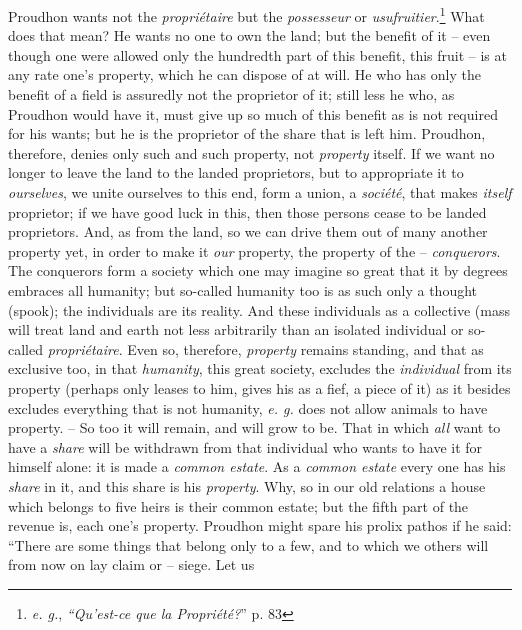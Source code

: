\documentclass[12pt,a4paper]{book}
\begin{document}
Proudhon wants not the \textit{propri\'etaire} but the \textit{possesseur} or 
\textit{usufruitier}.\footnote{\textit{e. g.}, \textit{``Qu'est-ce que la 
Propri\'et\'e?}'' p. 83} What does that mean? He wants no one to own the 
land; but the benefit of it -- even though one were allowed only the hundredth 
part of this benefit, this fruit -- is at any rate one's property, which he 
can dispose of at will. He who has only the benefit of a field is assuredly 
not the proprietor of it; still less he who, as Proudhon would have it, must 
give up so much of this benefit as is not required for his wants; but he is 
the proprietor of the share that is left him. Proudhon, therefore, denies only 
such and such property, not \textit{property} itself. If we want no longer to 
leave the land to the landed proprietors, but to appropriate it to 
\textit{ourselves}, we unite ourselves to this end, form a union, a 
\textit{soci\'et\'e}, that makes \textit{itself} proprietor; if we have good 
luck in this, then those persons cease to be landed proprietors. And, as from 
the land, so we can drive them out of many another property yet, in order to 
make it \textit{our} property, the property of the -- \textit{conquerors}. The 
conquerors form a society which one may imagine so great that it by degrees 
embraces all humanity; but so-called humanity too is as such only a thought 
(spook); the individuals are its reality. And these individuals as a 
collective (mass will treat land and earth not less arbitrarily than an 
isolated individual or so-called \textit{propri\'etaire}. Even so, therefore, 
\textit{property} remains standing, and that as exclusive too, in that 
\textit{humanity}, this great society, excludes the \textit{individual} from 
its property (perhaps only leases to him, gives his as a fief, a piece of it) 
as it besides excludes everything that is not humanity, \textit{e. g.} does 
not allow animals to have property. -- So too it will remain, and will grow to 
be. That in which \textit{all} want to have a \textit{share} will be withdrawn 
from that individual who wants to have it for himself alone: it is made a 
\textit{common estate}. As a \textit{common estate} every one has his 
\textit{share} in it, and this share is his \textit{property}. Why, so in our 
old relations a house which belongs to five heirs is their common estate; but 
the fifth part of the revenue is, each one's property. Proudhon might spare 
his prolix pathos if he said: ``There are some things that belong only to a 
few, and to which we others will from now on lay claim or -- siege. Let us 
\end{document}
